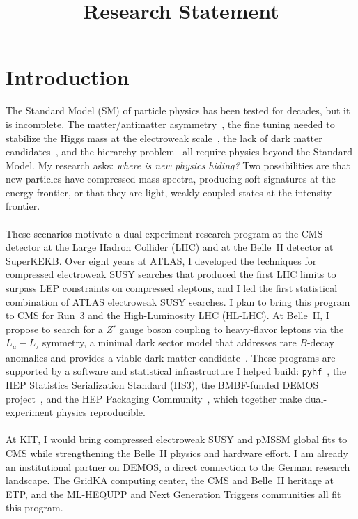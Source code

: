 \documentclass[10pt,a4paper,sans]{moderncv} %
\title{Research Statement}
\begin{document}
\renewcommand*{\bibliographyhead}[1]{\section{#1}}
\makecvtitle %
\vspace*{-4em}

\section{Introduction}

The Standard Model (SM) of particle physics has been tested for decades, but it is incomplete. The matter/antimatter asymmetry~\cite{canetti2012matter}, the fine tuning needed to stabilize the Higgs mass at the electroweak scale~\cite{Baer:2013ava}, the lack of dark matter candidates~\cite{bertone2005particle,Ade:2015xua}, and the hierarchy problem~\cite{tHooft:1980xss} all require physics beyond the Standard Model. My research asks: \textit{where is new physics hiding?} Two possibilities are that new particles have compressed mass spectra, producing soft signatures at the energy frontier, or that they are light, weakly coupled states at the intensity frontier.
\\
\\
These scenarios motivate a dual-experiment research program at the CMS detector at the Large Hadron Collider (LHC) and at the Belle~II detector at SuperKEKB. Over eight years at ATLAS, I developed the techniques for compressed electroweak SUSY searches that produced the first LHC limits to surpass LEP constraints on compressed sleptons, and I led the first statistical combination of ATLAS electroweak SUSY searches. I plan to bring this program to CMS for Run~3 and the High-Luminosity LHC (HL-LHC). At Belle~II, I propose to search for a $Z'$ gauge boson coupling to heavy-flavor leptons via the $L_\mu - L_\tau$ symmetry, a minimal dark sector model that addresses rare $B$-decay anomalies and provides a viable dark matter candidate~\cite{Altmannshofer:2016jzy}. These programs are supported by a software and statistical infrastructure I helped build: \texttt{pyhf}~\cite{Heinrich2021}, the HEP Statistics Serialization Standard (HS3), the BMBF-funded DEMOS project~\cite{DEMOS2025}, and the HEP Packaging Community~\cite{HEPPackaging2025}, which together make dual-experiment physics reproducible.
\\
\\
At KIT, I would bring compressed electroweak SUSY and pMSSM global fits to CMS while strengthening the Belle~II physics and hardware effort. I am already an institutional partner on DEMOS, a direct connection to the German research landscape. The GridKA computing center, the CMS and Belle~II heritage at ETP, and the ML-HEQUPP and Next Generation Triggers communities all fit this program.
\end{document}
